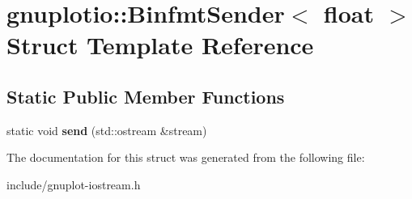 \hypertarget{structgnuplotio_1_1BinfmtSender_3_01float_01_4}{}\section{gnuplotio\+:\+:Binfmt\+Sender$<$ float $>$ Struct Template Reference}
\label{structgnuplotio_1_1BinfmtSender_3_01float_01_4}
\subsection*{Static Public Member Functions}
\begin{DoxyCompactItemize}
\item 
\mbox{\label{structgnuplotio_1_1BinfmtSender_3_01float_01_4_ae9c6a1915ee24e54ea5ed1a22c54fee1}} 
static void {\bfseries send} (std\+::ostream \&stream)
\end{DoxyCompactItemize}


The documentation for this struct was generated from the following file\+:\begin{DoxyCompactItemize}
\item 
include/gnuplot-\/iostream.\+h\end{DoxyCompactItemize}

